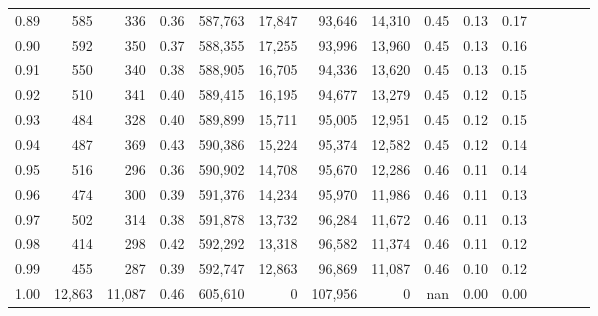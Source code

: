 \begin{tabular}{rrrcrrrrrrrrrrr}
0.89 &     585 &     336 &                                       0.36 &  587,763 &   17,847 &   93,646 &   14,310 &  0.45 &  0.13 &                         0.17 \\
0.90 &     592 &     350 &                                       0.37 &  588,355 &   17,255 &   93,996 &   13,960 &  0.45 &  0.13 &                         0.16 \\
0.91 &     550 &     340 &                                       0.38 &  588,905 &   16,705 &   94,336 &   13,620 &  0.45 &  0.13 &                         0.15 \\
0.92 &     510 &     341 &                                       0.40 &  589,415 &   16,195 &   94,677 &   13,279 &  0.45 &  0.12 &                         0.15 \\
0.93 &     484 &     328 &                                       0.40 &  589,899 &   15,711 &   95,005 &   12,951 &  0.45 &  0.12 &                         0.15 \\
0.94 &     487 &     369 &                                       0.43 &  590,386 &   15,224 &   95,374 &   12,582 &  0.45 &  0.12 &                         0.14 \\
0.95 &     516 &     296 &                                       0.36 &  590,902 &   14,708 &   95,670 &   12,286 &  0.46 &  0.11 &                         0.14 \\
0.96 &     474 &     300 &                                       0.39 &  591,376 &   14,234 &   95,970 &   11,986 &  0.46 &  0.11 &                         0.13 \\
0.97 &     502 &     314 &                                       0.38 &  591,878 &   13,732 &   96,284 &   11,672 &  0.46 &  0.11 &                         0.13 \\
0.98 &     414 &     298 &                                       0.42 &  592,292 &   13,318 &   96,582 &   11,374 &  0.46 &  0.11 &                         0.12 \\
0.99 &     455 &     287 &                                       0.39 &  592,747 &   12,863 &   96,869 &   11,087 &  0.46 &  0.10 &                         0.12 \\
1.00 &  12,863 &  11,087 &                                       0.46 &  605,610 &        0 &  107,956 &        0 &   nan &  0.00 &                         0.00 \\
\bottomrule
\end{tabular}
